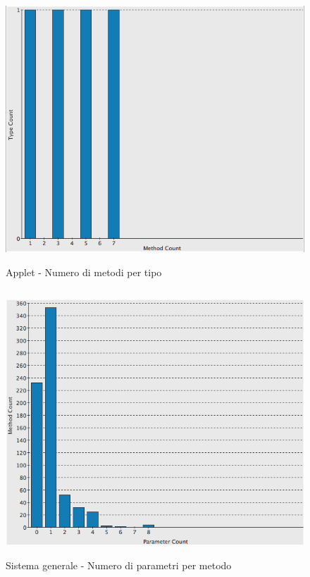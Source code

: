 \begin{figure}[htbp]
  \centering
  \includegraphics[height=10cm]{img/PQ/NumberOfMethodsPerTypeAPPLET.png}
\caption{Applet - Numero di metodi per tipo}
\end{figure}

\begin{figure}[htbp]
  \centering
  \includegraphics[height=10cm]{img/PQ/NumberOfParameters.png}
\caption{Sistema generale - Numero di parametri per metodo}
\end{figure}

